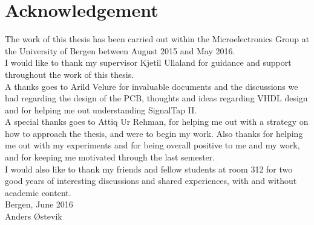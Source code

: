 \documentclass[main.tex]{subfiles}
\begin{document}
\chapter*{Acknowledgement}



{\setlength{\parindent}{0cm}
The work of this thesis has been carried out within the Microelectronics Group at the University of Bergen between August 2015 and May 2016.\\

I would like to thank my supervisor Kjetil Ullaland for guidance and support throughout the work of this thesis. \\

A thanks goes to Arild Velure for invaluable documents and the discussions we had regarding the design of the PCB, thoughts and ideas regarding VHDL design and for helping me out understanding SignalTap II.\\

A special thanks goes to Attiq Ur Rehman, for helping me out with a strategy on how to approach the thesis, and were to begin my work. Also thanks for helping me out with my experiments and for being overall positive to me and my work, and for keeping me motivated through the last semester.\\

I would also like to thank my friends and fellow students at room 312 for two good years of interesting discussions and shared experiences, with and without academic content.\\



Bergen, June 2016 \\[1em]


Anders Østevik

}

\end{document}
